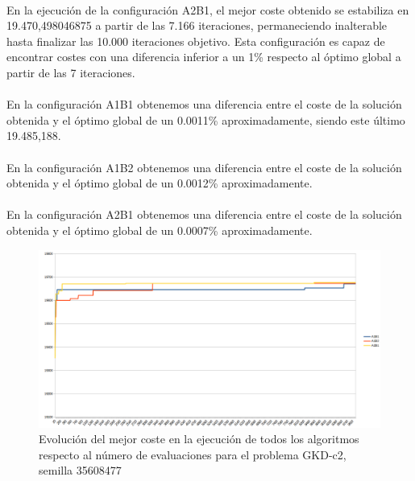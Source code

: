 	\paragraph{}En la ejecución de la configuración A2B1, el mejor coste obtenido se estabiliza en 19.470,498046875 a partir de las 7.166 iteraciones, permaneciendo inalterable hasta finalizar las 10.000 iteraciones objetivo. Esta configuración es capaz de encontrar costes con una diferencia inferior a un 1\% respecto al óptimo global a partir de las 7 iteraciones.
	
	\paragraph{}En la configuración A1B1 obtenemos una diferencia entre el coste de la solución obtenida y el óptimo global de un 0.0011\% aproximadamente, siendo este último 19.485,188.
	
	\paragraph{}En la configuración A1B2 obtenemos una diferencia entre el coste de la solución obtenida y el óptimo global de un 0.0012\% aproximadamente.
	
	\paragraph{}En la configuración A2B1 obtenemos una diferencia entre el coste de la solución obtenida y el óptimo global de un 0.0007\% aproximadamente.	

	\begin{figure}[H]
		\centering
		\includegraphics[scale=0.3]{img/GKD2conver.png}
		\caption{Evolución del mejor coste en la ejecución de todos los algoritmos 	respecto al número de evaluaciones para el problema GKD-c2, semilla 35608477}
		\label{gkd-c2_historico}
	\end{figure}

